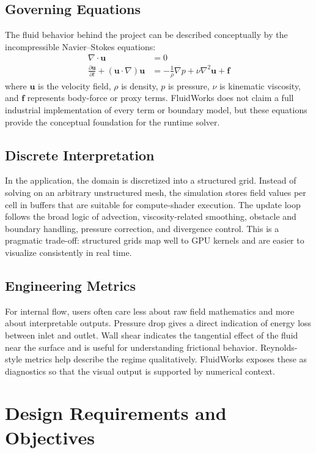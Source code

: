 \documentclass[12pt,a4paper,titlepage]{report}
\begin{document}
\section{Governing Equations}
The fluid behavior behind the project can be described conceptually by the incompressible Navier--Stokes equations:
\begin{align}
\nabla \cdot \mathbf{u} &= 0 \\
\frac{\partial \mathbf{u}}{\partial t} + (\mathbf{u}\cdot\nabla)\mathbf{u} &= -\frac{1}{\rho}\nabla p + \nu \nabla^2 \mathbf{u} + \mathbf{f}
\end{align}
where $\mathbf{u}$ is the velocity field, $\rho$ is density, $p$ is pressure, $\nu$ is kinematic viscosity, and $\mathbf{f}$ represents body-force or proxy terms. FluidWorks does not claim a full industrial implementation of every term or boundary model, but these equations provide the conceptual foundation for the runtime solver.

\section{Discrete Interpretation}
In the application, the domain is discretized into a structured grid. Instead of solving on an arbitrary unstructured mesh, the simulation stores field values per cell in buffers that are suitable for compute-shader execution. The update loop follows the broad logic of advection, viscosity-related smoothing, obstacle and boundary handling, pressure correction, and divergence control. This is a pragmatic trade-off: structured grids map well to GPU kernels and are easier to visualize consistently in real time.

\section{Engineering Metrics}
For internal flow, users often care less about raw field mathematics and more about interpretable outputs. Pressure drop gives a direct indication of energy loss between inlet and outlet. Wall shear indicates the tangential effect of the fluid near the surface and is useful for understanding frictional behavior. Reynolds-style metrics help describe the regime qualitatively. FluidWorks exposes these as diagnostics so that the visual output is supported by numerical context.

\chapter{Design Requirements and Objectives}
\end{document}
